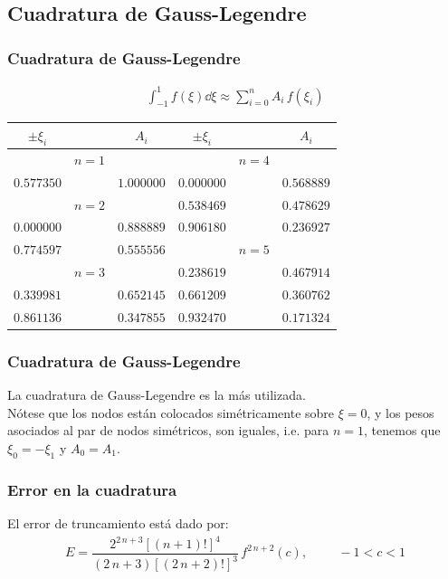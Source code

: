 \subsection{Cuadratura de Gauss-Legendre}
\begin{frame}[plain]
\frametitle{Cuadratura de Gauss-Legendre}
\begin{align*}
\int_{-1}^{1} f(\xi) \dd{\xi} \approx \sum_{i=0}^{n} A_{i} \, f(\xi_{i})
\end{align*}
\fontsize{10}{10}\selectfont
\begin{center}
\begin{tabular}{|c c c | c c c|}
\hline
$\pm \xi_{i}$ &       & $A_{i}$    & $\pm \xi_{i}$ &       & $A_{i}$ \\ \hline
             & $n=1$ &            &               & $n=4$ &         \\ %
$0.577350$    &       & $1.000000$ & $0.000000$    &       & $0.568889$ \\ %
             & $n=2$ &            & $0.538469$    &       & $0.478629$ \\ %
$0.000000$    &       & $0.888889$ & $0.906180$    &       & $0.236927$ \\ %
$0.774597$    &       & $0.555556$ &               & $n=5$ &            \\ %
             & $n=3$ &            & $0.238619$    &       & $0.467914$ \\ %
$0.339981$    &       & $0.652145$ & $0.661209$    &       & $0.360762$ \\ %
$0.861136$    &       & $0.347855$ & $0.932470$    &       & $0.171324$ \\ \hline
\end{tabular}
\end{center}
\end{frame}
\begin{frame}
\frametitle{Cuadratura de Gauss-Legendre}
La cuadratura de Gauss-Legendre es la más utilizada. 
\\
\bigskip
Nótese que los nodos están colocados simétricamente sobre $\xi=0$, y los pesos asociados al par de nodos simétricos, son iguales, i.e. para $n=1$, tenemos que $\xi_{0} = - \xi_{1}$ y $A_{0} = A_{1}$.
\end{frame}
\begin{frame}
\frametitle{Error en la cuadratura}
El error de truncamiento está dado por:
\begin{align*}
E = \dfrac{2^{2 \, n + 3} [(n + 1)!]^{4}}{(2 \, n + 3)[(2 \, n + 2)!]^{3}} \, f^{2 \, n + 2} (c), \hspace{1cm} -1 < c < 1
\end{align*}
\end{frame}
